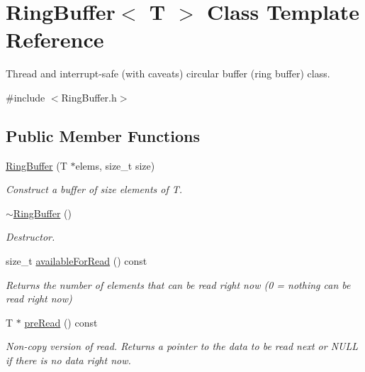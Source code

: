 \hypertarget{class_ring_buffer}{}\section{Ring\+Buffer$<$ T $>$ Class Template Reference}
\label{class_ring_buffer}


Thread and interrupt-\/safe (with caveats) circular buffer (ring buffer) class.  




{\ttfamily \#include $<$Ring\+Buffer.\+h$>$}

\subsection*{Public Member Functions}
\begin{DoxyCompactItemize}
\item 
\mbox{\hyperlink{class_ring_buffer_a234232078f579680a091bc504b5eee5e}{Ring\+Buffer}} (T $\ast$elems, size\+\_\+t size)
\begin{DoxyCompactList}\small\item\em Construct a buffer of size elements of T. \end{DoxyCompactList}\item 
\mbox{\label{class_ring_buffer_a2ea502f6493ca669f07f9f01a4a94bdb}} 
\mbox{\hyperlink{class_ring_buffer_a2ea502f6493ca669f07f9f01a4a94bdb}{$\sim$\+Ring\+Buffer}} ()
\begin{DoxyCompactList}\small\item\em Destructor. \end{DoxyCompactList}\item 
size\+\_\+t \mbox{\hyperlink{class_ring_buffer_a2d77169348cd228b343ba2245e1ce371}{available\+For\+Read}} () const
\begin{DoxyCompactList}\small\item\em Returns the number of elements that can be read right now (0 = nothing can be read right now) \end{DoxyCompactList}\item 
T $\ast$ \mbox{\hyperlink{class_ring_buffer_a724ce39b381489539fda406e06596a1d}{pre\+Read}} () const
\begin{DoxyCompactList}\small\item\em Non-\/copy version of read. Returns a pointer to the data to be read next or N\+U\+LL if there is no data right now. \end{DoxyCompactList}\item 

\end{DoxyCompactItemize}
